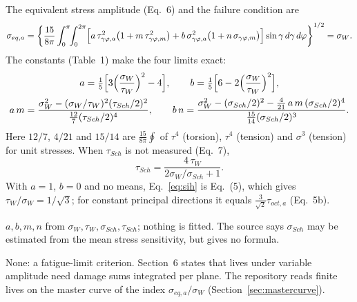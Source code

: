  The equivalent stress amplitude (Eq.~6) and the failure condition are
\begin{equation}
\sigma_{eq,a}=\left\{\frac{15}{8\pi}\int_0^{\pi}\!\!\int_0^{2\pi}\Bigl[a\,\tau_{\gamma\varphi,a}^2\bigl(1+m\,\tau_{\gamma\varphi,m}^2\bigr)
+b\,\sigma_{\gamma\varphi,a}^2\bigl(1+n\,\sigma_{\gamma\varphi,m}\bigr)\Bigr]\sin\gamma\,d\gamma\,d\varphi\right\}^{1/2}=\sigma_W .
\label{eq:sih}
\end{equation}
The constants (Table~1) make the four limits exact:
\begin{gather}
a=\tfrac15\Bigl[3\Bigl(\frac{\sigma_W}{\tau_W}\Bigr)^2-4\Bigr],\qquad
b=\tfrac15\Bigl[6-2\Bigl(\frac{\sigma_W}{\tau_W}\Bigr)^2\Bigr],\\
a\,m=\frac{\sigma_W^2-(\sigma_W/\tau_W)^2(\tau_{Sch}/2)^2}{\tfrac{12}{7}(\tau_{Sch}/2)^4},\qquad
b\,n=\frac{\sigma_W^2-(\sigma_{Sch}/2)^2-\tfrac{4}{21}\,a\,m\,(\sigma_{Sch}/2)^4}{\tfrac{15}{14}(\sigma_{Sch}/2)^3}.
\end{gather}
Here $12/7$, $4/21$ and $15/14$ are $\tfrac{15}{8\pi}\oint$ of $\tau^4$ (torsion), $\tau^4$
(tension) and $\sigma^3$ (tension) for unit stresses. When $\tau_{Sch}$ is not measured (Eq.~7),
\begin{equation}
\tau_{Sch}=\frac{4\,\tau_W}{2\sigma_W/\sigma_{Sch}+1}.
\end{equation}
With $a=1$, $b=0$ and no means, Eq.~\eqref{eq:sih} is Eq.~(5), which gives $\tau_W/\sigma_W=1/\sqrt3$;
for constant principal directions it equals $\tfrac{3}{\sqrt2}\tau_{oct,a}$ (Eq.~5b).

 $a,b,m,n$ from $\sigma_W,\tau_W,\sigma_{Sch},\tau_{Sch}$; nothing
is fitted. The source says $\sigma_{Sch}$ may be estimated from the mean stress sensitivity, but
gives no formula.

 None: a fatigue-limit criterion. Section~6 states that lives under variable amplitude
need damage sums integrated per plane. The repository reads finite lives on the master curve of
the index $\sigma_{eq,a}/\sigma_W$ (Section~\ref{sec:mastercurve}).

